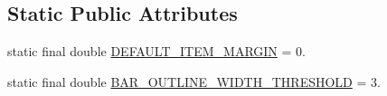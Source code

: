 \subsection*{Static Public Attributes}
\begin{DoxyCompactItemize}
\item 
static final double \mbox{\hyperlink{classorg_1_1jfree_1_1chart_1_1renderer_1_1category_1_1_bar_renderer_aa61e0688317d2f77eee86eeeb75ed0f9}{D\+E\+F\+A\+U\+L\+T\+\_\+\+I\+T\+E\+M\+\_\+\+M\+A\+R\+G\+IN}} = 0.
\item 
static final double \mbox{\hyperlink{classorg_1_1jfree_1_1chart_1_1renderer_1_1category_1_1_bar_renderer_a1798a567d74a408e4ba75b47f9b73602}{B\+A\+R\+\_\+\+O\+U\+T\+L\+I\+N\+E\+\_\+\+W\+I\+D\+T\+H\+\_\+\+T\+H\+R\+E\+S\+H\+O\+LD}} = 3.
\end{DoxyCompactItemize}
